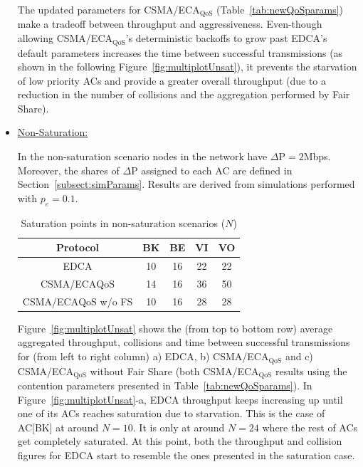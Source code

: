 \begin{itemize}
The updated parameters for CSMA/ECA$_{\text{QoS}}$ (Table~\ref{tab:newQoSparams}) make a tradeoff between throughput and aggressiveness. Even-though allowing CSMA/ECA$_{\text{QoS}}$'s deterministic backoffs to grow past EDCA's default parameters increases the time between successful transmissions (as shown in the following Figure~\ref{fig:multiplotUnsat}), it prevents the starvation of low priority ACs and provide a greater overall throughput (due to a reduction in the number of collisions and the aggregation performed by Fair Share).


\item\underline{Non-Saturation:}

In the non-saturation scenario nodes in the network have $\Delta\text{P}=2$Mbps. Moreover, the shares of $\Delta\text{P}$ assigned to each AC are defined in Section~\ref{subsect:simParams}. Results are derived from simulations performed with $p_e=0.1$.

	\begin{table}[t]
		\centering
		\caption{Saturation points in non-saturation scenarios ($N$)}
		\label{tab:satPoints}
		\begin{tabular}{|c|c|c|c|c|}
			\hline
			{\bfseries Protocol} 				& {\bfseries BK} & {\bfseries BE} & {\bfseries VI} & {\bfseries VO}\\
			\hline
			EDCA						&	10		&	16		&		22	&	22\\	
			\hline
			CSMA/ECA${\text{QoS}}$		&	14		&	16		&		36	&	50\\
			\hline
			CSMA/ECA${\text{QoS}}$ w/o FS	&	10		&	16		&		28	&	28\\
			\hline
		\end{tabular}
	\end{table}

Figure~\ref{fig:multiplotUnsat} shows the (from top to bottom row) average aggregated throughput, collisions and time between successful transmissions for (from left to right column) a) EDCA, b) CSMA/ECA$_{\text{QoS}}$ and c) CSMA/ECA$_{\text{QoS}}$ without Fair Share (both CSMA/ECA$_{\text{QoS}}$ results using the contention parameters presented in Table~\ref{tab:newQoSparams}). In Figure~\ref{fig:multiplotUnsat}-a, EDCA throughput keeps increasing up until one of its ACs reaches saturation due to starvation. This is the case of AC[BK] at around $N=10$. It is only at around $N=24$ where the rest of ACs get completely saturated. At this point, both the throughput and collision figures for EDCA start to resemble the ones presented in the saturation case.


\end{itemize}

